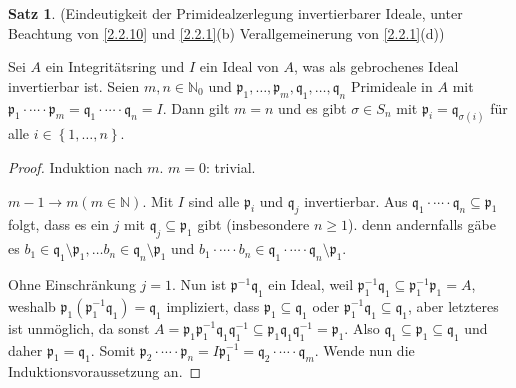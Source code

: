 \documentclass[
twoside=semi,
fontsize=12,
DIV=12, 
cleardoublepage=current,
leqno,
headings=optiontoheadandtoc, 
toc=idx
]{scrbook}
\newcommand{\N}{\mathbb{N}}
\newcommand{\set}[1]{\left\{ #1 \right\}}
\theoremstyle{definition}
\newtheorem{satz}[definition]{Satz}
\begin{document}
 	\begin{satz}\label{2.2.11} (Eindeutigkeit der Primidealzerlegung invertierbarer Ideale, unter Beachtung von \ref{2.2.10} und \ref{2.2.1}(b) Verallgemeinerung von \ref{2.2.1}(d)) \newline
 		
 		Sei $A$ ein Integrit\"atsring und $I$ ein Ideal von $A$, was als gebrochenes Ideal invertierbar ist. Seien $m, n \in \N_0$ und $\mathfrak{p}_1,\dots, \mathfrak{p}_m,\mathfrak{q}_1,\dots,\mathfrak{q}_n$ Primideale in $A$ mit \linebreak $\mathfrak{p}_1\cdot \cdots \cdot \mathfrak{p}_m = \mathfrak{q}_1 \cdot \cdots \cdot \mathfrak{q}_n = I$. Dann gilt $m = n$ und es gibt $\sigma \in S_n$ mit $\mathfrak{p}_i = \mathfrak{q}_{\sigma(i)}$ f\"ur alle $i \in \set{1,\dots, n}$.
 		
 		\begin{proof}
 			Induktion nach $m$. $m = 0$: trivial.
 			
 			$m-1 \to m (m \in \N)$. Mit $I$ sind alle $\mathfrak{p}_i$ und $\mathfrak{q}_j$ invertierbar. Aus $\mathfrak{q}_1\cdot \cdots \cdot \mathfrak{q}_n \subseteq \mathfrak{p}_1$ folgt, dass es ein $j$ mit $\mathfrak{q}_j \subseteq \mathfrak{p}_1$ gibt (insbesondere $n\geq 1$). denn andernfalls g\"abe es $b_1 \in \mathfrak{q}_1\setminus \mathfrak{p}_1, \dots b_n \in \mathfrak{q}_n\setminus \mathfrak{p}_1$ und $b_1\cdot \cdots \cdot b_n \in \mathfrak{q}_1\cdot \cdots \cdot \mathfrak{q}_n \setminus \mathfrak{p}_1$.
 			
 			Ohne Einschr\"ankung $j=1$. Nun ist $\mathfrak{p}^{-1}\mathfrak{q}_1$ ein Ideal, weil $\mathfrak{p}_1^{-1}\mathfrak{q}_1 \subseteq \mathfrak{p}_1^{-1}\mathfrak{p}_1 = A$, weshalb $\mathfrak{p}_1(\mathfrak{p}_1^{-1}\mathfrak{q}_1) = \mathfrak{q}_1$ impliziert, dass $\mathfrak{p}_1 \subseteq \mathfrak{q}_1$ oder $\mathfrak{p}_1^{-1}\mathfrak{q}_1 \subseteq \mathfrak{q}_1$, aber letzteres ist unm\"oglich, da sonst $A = \mathfrak{p}_1\mathfrak{p}_1^{-1}\mathfrak{q}_1\mathfrak{q}_1^{-1}\subseteq \mathfrak{p}_1\mathfrak{q}_1\mathfrak{q}_1^{-1} = \mathfrak{p}_1$. Also $\mathfrak{q}_1 \subseteq \mathfrak{p}_1 \subseteq \mathfrak{q}_1$ und daher $\mathfrak{p}_1 = \mathfrak{q}_1$. Somit $\mathfrak{p}_2 \cdot \cdots \cdot \mathfrak{p}_n = I\mathfrak{p}_1^{-1} = \mathfrak{q}_2 \cdot \cdots \cdot \mathfrak{q}_m$. Wende nun die Induktionsvoraussetzung an.
 		\end{proof}
 	\end{satz}
 
\end{document}
